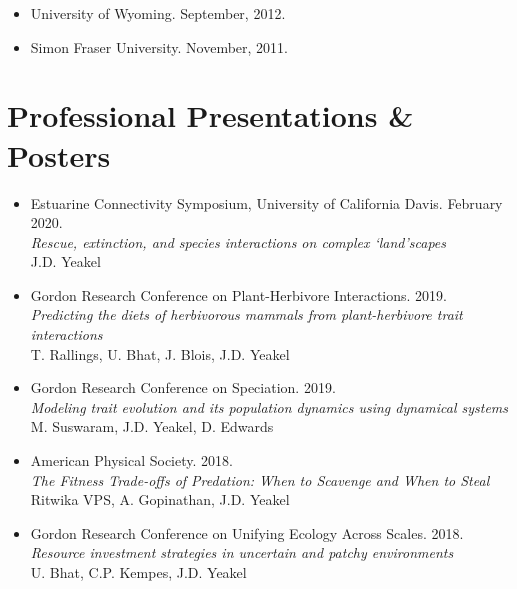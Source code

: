 \documentclass[margin,line,12pt]{res}
\begin{document}
\begin{resume}
\begin{itemize}
\item University of Wyoming. September, 2012.

\item Simon Fraser University. November, 2011.
\end{itemize}

\section{\sc Professional Presentations \& Posters}
\begin{itemize}

\item Estuarine Connectivity Symposium, University of California Davis. February 2020.\\
\emph{Rescue, extinction, and species interactions on complex `land'scapes}\\
J.D. Yeakel

\item Gordon Research Conference on Plant-Herbivore Interactions. 2019.\\
\emph{Predicting the diets of herbivorous mammals from plant-herbivore trait interactions}\\
T. Rallings, U. Bhat, J. Blois, J.D. Yeakel

\item Gordon Research Conference on Speciation. 2019.\\
\emph{Modeling trait evolution and its population dynamics using dynamical systems}\\
M. Suswaram, J.D. Yeakel, D. Edwards

\item American Physical Society. 2018.\\
\emph{The Fitness Trade-offs of Predation: When to Scavenge and When to Steal}\\
Ritwika VPS, A. Gopinathan, J.D. Yeakel

\item Gordon Research Conference on Unifying Ecology Across Scales. 2018.\\
\emph{Resource investment strategies in uncertain and patchy environments}\\
U. Bhat, C.P. Kempes, J.D. Yeakel


\end{itemize}
\end{resume}
\end{document}
